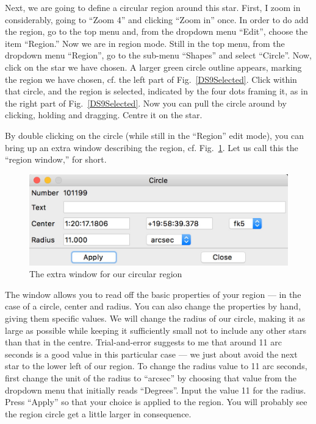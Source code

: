 \documentclass[twocolumn,apj]{openjournal}
\begin{document}
Next, we are going to define a circular region around this star. First, I zoom in considerably, going to ``Zoom 4'' and clicking ``Zoom in'' once. In order to do add the region, go to the top menu and, from the dropdown menu ``Edit'', choose the item ``Region.'' Now we are in region mode. Still in the top menu, from the dropdown menu ``Region'', go to the sub-menu ``Shapes'' and select ``Circle''. Now, click on the star we have chosen. A larger green circle outline appears, marking the region we have chosen, cf. the left part of Fig.~\ref{DS9Selected}.  Click within that circle, and the region is selected, indicated by the four dots framing it, as in the right part of Fig.~\ref{DS9Selected}. Now you can pull the circle around by clicking, holding and dragging. Centre it on the star.

By double clicking on the circle (while still in the ``Region'' edit mode), you can bring up an extra window describing the region, cf. Fig.~\ref{RegionWindow}. Let us call this the ``region window,'' for short.
\begin{figure}[htbp]
\begin{center}
\includegraphics[width=\linewidth]{regionwindow.jpg}
\caption{The extra window for our circular region}
\label{RegionWindow}
\end{center}
\end{figure}
The window allows you to read off the basic properties of your region --- in the case of a circle, center and radius. You can also change the properties by hand, giving them specific values. We will change the radius of our circle, making it as large as possible while keeping it sufficiently small not to include any other stars than that in the centre. Trial-and-error suggests to me that around 11 arc seconds is a good value in this particular case --- we just about avoid the next star to the lower left of our region. To change the radius value to 11 arc seconds, first change the unit of the radius to ``arcsec'' by choosing that value from the dropdown menu that initially reads ``Degrees''. Input the value 11 for the radius. Press ``Apply'' so that your choice is applied to the region. You will probably see the region circle get a little larger in consequence.
\end{document}
